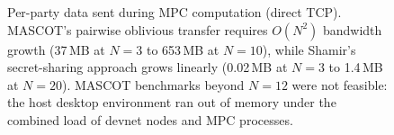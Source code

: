 \begin{figure}[htbp]
  \centering
  \caption{Per-party data sent during MPC computation (direct TCP).
    MASCOT's pairwise oblivious transfer requires $O(N^2)$ bandwidth
    growth (37\,MB at $N{=}3$ to 653\,MB at $N{=}10$), while Shamir's
    secret-sharing approach grows linearly
    (0.02\,MB at $N{=}3$ to 1.4\,MB at $N{=}20$).  MASCOT benchmarks
    beyond $N{=}12$ were not feasible: the host desktop environment
    ran out of memory under the combined load of devnet nodes and
    MPC processes.}
  \label{fig:bandwidth}
\end{figure}

